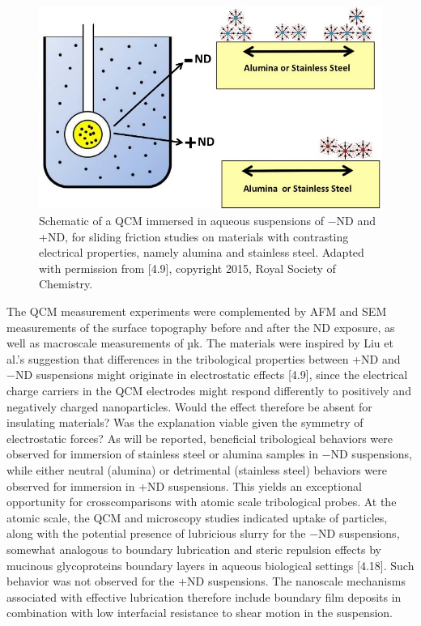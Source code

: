 \begin{figure}[hbtp]
	\centering
	\includegraphics[width=1.0\textwidth]{Chapter-4/fig2_png}
	\caption{Schematic of a QCM immersed in aqueous suspensions of −ND and +ND, for sliding friction studies on materials with contrasting electrical properties, namely alumina and stainless steel. Adapted with permission from [4.9], copyright 2015, Royal Society of Chemistry.}
	\label{fig2: SRS-in-beaker}
\end{figure} 

The QCM measurement experiments were complemented by AFM and SEM measurements of the surface topography before and after the ND exposure, as well as macroscale measurements of µk. The materials were inspired by Liu et al.’s suggestion that differences in the tribological properties between +ND and −ND suspensions might originate in electrostatic effects [4.9], since the electrical charge carriers in the QCM electrodes might respond differently to positively and negatively charged nanoparticles. Would the effect therefore be absent for insulating materials? Was the explanation viable given the symmetry of electrostatic forces?
As will be reported, beneficial tribological behaviors were observed for immersion of stainless steel or alumina samples in −ND suspensions, while either neutral (alumina) or detrimental (stainless steel) behaviors were observed for immersion in +ND suspensions. This yields an exceptional opportunity for crosscomparisons with atomic scale tribological probes. At the atomic scale, the QCM and microscopy studies indicated uptake of particles, along with the potential presence of lubricious slurry for the −ND suspensions, somewhat analogous to boundary lubrication and steric repulsion effects by mucinous glycoproteins boundary layers in aqueous biological settings [4.18]. Such behavior was not observed for the +ND suspensions. The nanoscale mechanisms associated with effective lubrication therefore include boundary film deposits in combination with low interfacial resistance to shear motion in the suspension.

